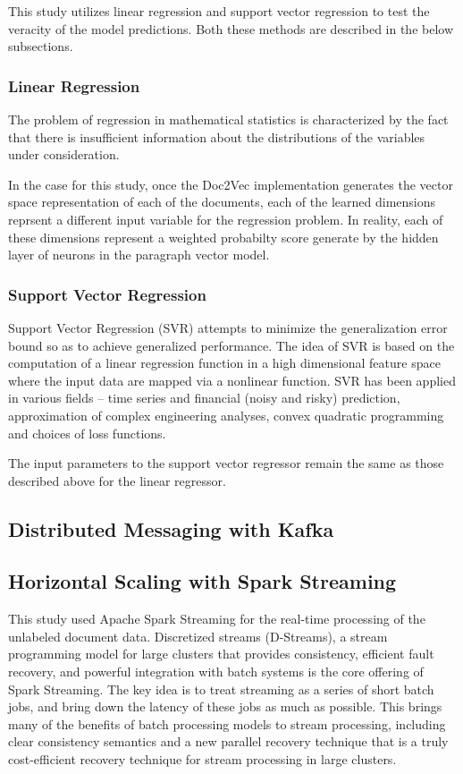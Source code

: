 \documentclass[conference]{IEEEtran}
\begin{document}
This study utilizes linear regression and support vector regression to test the veracity of the model predictions. Both these methods are described in the below subsections.

\subsubsection{Linear Regression}
The problem of regression in mathematical statistics is characterized by the fact that there is insufficient information about the distributions of the variables under consideration\cite{regression_analysis}.

In the case for this study, once the Doc2Vec implementation generates the vector space representation of each of the documents, each of the learned dimensions reprsent a different input variable for the regression problem. In reality, each of these dimensions represent a weighted probabilty score generate by the hidden layer of neurons in the paragraph vector model.

\subsubsection{Support Vector Regression}
Support Vector Regression (SVR) attempts to minimize the generalization error bound so as to achieve generalized performance. The idea of SVR is based on the computation of a linear regression function in a high dimensional feature space where the input data are mapped via a nonlinear function. SVR has been applied in various fields – time series and financial (noisy and risky) prediction, approximation of complex engineering analyses, convex quadratic programming and choices of loss functions\cite{basak2007support}.

The input parameters to the support vector regressor remain the same as those described above for the linear regressor.


\subsection{Distributed Messaging with Kafka}


\subsection{Horizontal Scaling with Spark Streaming}
This study used Apache Spark Streaming for the real-time processing of the unlabeled document data. Discretized streams (D-Streams), a stream programming model for large clusters that provides consistency, efficient fault recovery, and powerful integration with batch systems is the core offering of Spark Streaming. The key idea is to treat streaming as a series of short batch jobs, and bring down the latency of these jobs as much as possible. This brings many of the benefits of batch processing models to stream processing, including clear consistency semantics and a new parallel recovery technique that is a truly cost-efficient recovery technique for stream processing in large clusters\cite{zaharia2012discretized}.
\end{document}
